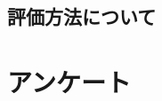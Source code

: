 \documentclass{funthesis}
\begin{document}


\subsection{評価方法について}







\section{アンケート}


\end{document}
